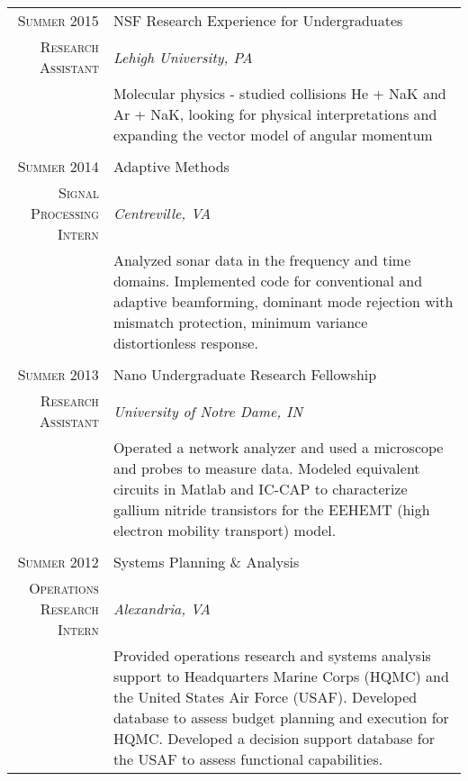 \documentclass[a4paper,10pt]{article} %
\begin{document}
\begin{tabular}{r|p{11cm}}
\textsc{Summer 2015} & NSF Research Experience for Undergraduates \\
\textsc{Research Assistant} & \emph{Lehigh University, PA}\\ 
& \footnotesize{Molecular physics - studied collisions He + NaK and Ar + NaK,
looking for physical interpretations and expanding the vector model of angular
momentum}\\
\multicolumn{2}{c}{} \\


\textsc{Summer 2014} & Adaptive Methods \\
\textsc{Signal Processing Intern} & \emph{Centreville, VA}\\ 
& \footnotesize{Analyzed sonar data in the frequency and time domains.
Implemented code for conventional and adaptive beamforming, dominant mode
rejection with mismatch protection, minimum variance distortionless response.}\\
\multicolumn{2}{c}{} \\


\textsc{Summer 2013} & Nano Undergraduate Research Fellowship \\
\textsc{Research Assistant} & \emph{University of Notre Dame, IN}\\ 
& \footnotesize{Operated a network analyzer and used a microscope and probes to
measure data. Modeled equivalent circuits in Matlab and IC-CAP to characterize gallium
nitride transistors for the EEHEMT (high electron mobility transport) model.}\\
\multicolumn{2}{c}{} \\


\textsc{Summer 2012} & Systems Planning \& Analysis\\
\textsc{Operations Research Intern} & \emph{Alexandria, VA}\\ 
& \footnotesize{Provided operations research and systems analysis support to
Headquarters Marine Corps (HQMC) and the United States Air Force (USAF). 
Developed database to assess budget planning and execution for HQMC\@.
Developed a decision support database for the USAF to assess functional
capabilities.}\\
\end{tabular}
\end{document}
